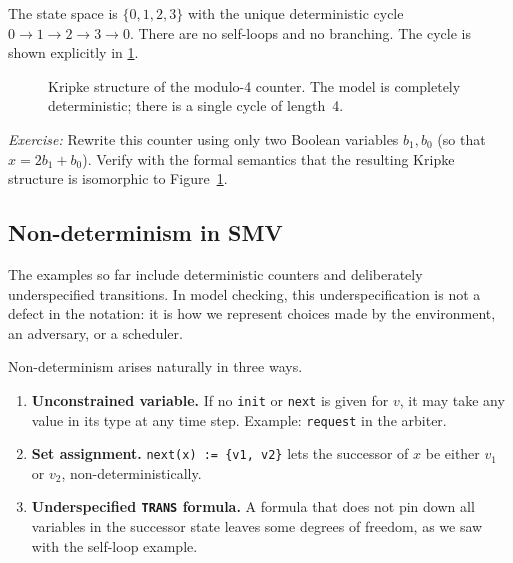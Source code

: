 The state space is $\{0, 1, 2, 3\}$ with the unique deterministic cycle
$0 \to 1 \to 2 \to 3 \to 0$.  There are no self-loops and no branching.
The cycle is shown explicitly in \cref{fig:mod4}.

\begin{figure}[ht]
  \centering
  \caption{Kripke structure of the modulo-4 counter.  The model is
           completely deterministic; there is a single cycle of length~4.}
  \label{fig:mod4}
\end{figure}

\noindent\textit{Exercise:} Rewrite this counter using only two Boolean
variables $b_1, b_0$ (so that $x = 2 b_1 + b_0$).  Verify with the formal
semantics that the resulting Kripke structure is isomorphic to
Figure~\ref{fig:mod4}.

\subsection{Non-determinism in SMV}
\label{sec:smv-nondeterminism}

The examples so far include deterministic counters and deliberately
underspecified transitions.  In model checking, this underspecification is
not a defect in the notation: it is how we represent choices made by the
environment, an adversary, or a scheduler.

Non-determinism arises naturally in three ways.

\begin{enumerate}
  \item \textbf{Unconstrained variable.}  If no \texttt{init} or
        \texttt{next} is given for $v$, it may take any value in its type
        at any time step.  Example: \texttt{request} in the arbiter.
  \item \textbf{Set assignment.}
        \texttt{next(x) := \{v1, v2\}} lets the successor of $x$ be
        either $v_1$ or $v_2$, non-deterministically.
  \item \textbf{Underspecified \texttt{TRANS} formula.}  A formula that
        does not pin down all variables in the successor state leaves some
        degrees of freedom, as we saw with the self-loop example.
\end{enumerate}

